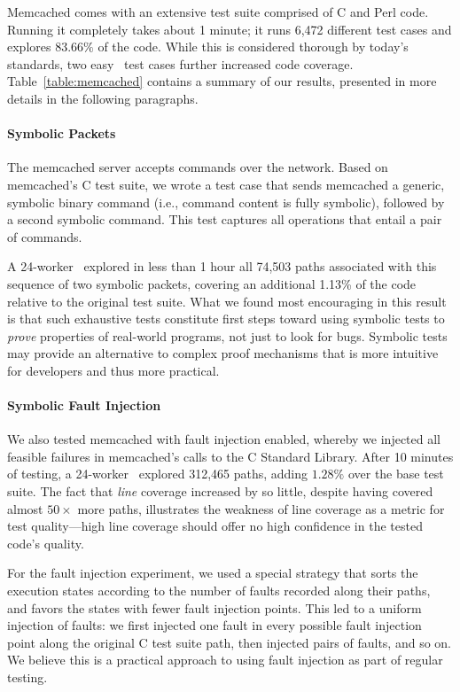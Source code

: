 Memcached comes with an extensive test suite comprised of C and Perl code. Running it completely takes about 1 minute; it runs 6,472 different test cases  and explores $83.66\%$ of the code. While this is considered thorough by today's standards, two easy \cnine\ test cases further increased code coverage. Table~\ref{table:memcached} contains a summary of our results, presented in more details in the following paragraphs.


\paragraph{Symbolic Packets}

The memcached server accepts commands over the network. Based on memcached's C test suite, we wrote a test case that sends memcached a generic, symbolic binary command (i.e., command content is fully symbolic), followed by a second symbolic command. This test captures all operations that entail a pair of commands.

A 24-worker \cnine\ explored in less than 1 hour all 74,503 paths associated with this sequence of two symbolic packets, covering an additional 1.13\% of the  code relative to the original test suite.  What we found most encouraging in this result is that such exhaustive tests constitute first steps toward using symbolic tests to \emph{prove} properties of real-world programs, not just to look for bugs.  Symbolic tests may provide an alternative to complex proof mechanisms that is more intuitive for developers and thus more practical.

\paragraph{Symbolic Fault Injection}

We also tested memcached with fault injection enabled, whereby we injected all feasible failures in memcached's calls to the C Standard Library.  After 10 minutes of testing, a 24-worker \cnine\ explored 312,465 paths, adding $1.28\%$ over the base test suite.  The fact that {\em line} coverage increased by so little, despite having covered almost $50\times$ more paths, illustrates the weakness of line coverage as a metric for test quality---high line coverage should offer no high confidence in the tested code's quality.

For the fault injection experiment, we used a special strategy that sorts the execution states according to the number of faults recorded along their paths, and favors the states with fewer fault injection points. This led to a uniform injection of faults: we first injected one fault in every possible fault injection point along the original C test suite path, then injected pairs of faults, and so on.  We believe this is a practical approach to using fault injection as part of regular testing.

